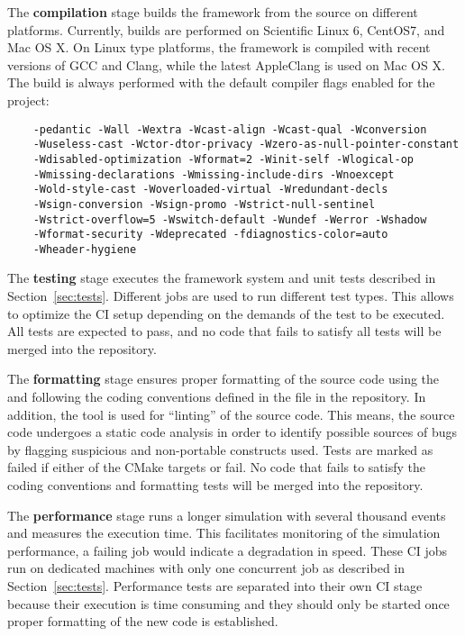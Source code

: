 The \textbf{compilation} stage builds the framework from the source on different platforms.
Currently, builds are performed on Scientific Linux 6, CentOS7, and Mac OS X.
On Linux type platforms, the framework is compiled with recent versions of GCC and Clang, while the latest AppleClang is used on Mac OS X.
The build is always performed with the default compiler flags enabled for the project:
\begin{verbatim}
    -pedantic -Wall -Wextra -Wcast-align -Wcast-qual -Wconversion
    -Wuseless-cast -Wctor-dtor-privacy -Wzero-as-null-pointer-constant
    -Wdisabled-optimization -Wformat=2 -Winit-self -Wlogical-op
    -Wmissing-declarations -Wmissing-include-dirs -Wnoexcept
    -Wold-style-cast -Woverloaded-virtual -Wredundant-decls
    -Wsign-conversion -Wsign-promo -Wstrict-null-sentinel
    -Wstrict-overflow=5 -Wswitch-default -Wundef -Werror -Wshadow
    -Wformat-security -Wdeprecated -fdiagnostics-color=auto
    -Wheader-hygiene
\end{verbatim}

The \textbf{testing} stage executes the framework system and unit tests described in Section~\ref{sec:tests}.
Different jobs are used to run different test types.
This allows to optimize the CI setup depending on the demands of the test to be executed.
All tests are expected to pass, and no code that fails to satisfy all tests will be merged into the repository.

The \textbf{formatting} stage ensures proper formatting of the source code using the  and following the coding conventions defined in the  file in the repository.
In addition, the  tool is used for ``linting'' of the source code.
This means, the source code undergoes a static code analysis in order to identify possible sources of bugs by flagging suspicious and non-portable constructs used.
Tests are marked as failed if either of the CMake targets  or  fail.
No code that fails to satisfy the coding conventions and formatting tests will be merged into the repository.

The \textbf{performance} stage runs a longer simulation with several thousand events and measures the execution time.
This facilitates monitoring of the simulation performance, a failing job would indicate a degradation in speed.
These CI jobs run on dedicated machines with only one concurrent job as described in Section~\ref{sec:tests}.
Performance tests are separated into their own CI stage because their execution is time consuming and they should only be started once proper  formatting of the new code is established.

